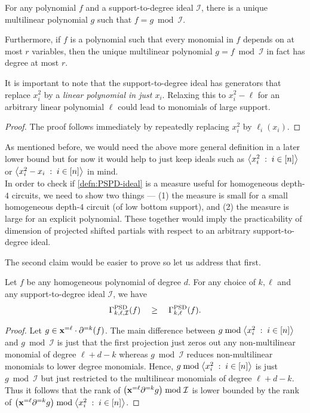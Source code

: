 \begin{observation}\label{obs:support-redn}
For any polynomial $f$ and a support-to-degree ideal $\mathcal{I}$, there is a unique multilinear polynomial $g$ such that $f = g \bmod\mathcal{I}$. 

Furthermore, if $f$ is a polynomial such that every monomial in $f$ depends on at most $r$ variables, then the unique multilinear polynomial $g = f \bmod\mathcal{I}$ in fact has degree at most $r$. 
\end{observation}

It is important to note that the support-to-degree ideal has generators that replace $x_i^2$ by a \emph{linear polynomial in just $x_i$}. Relaxing this to $x_i^2 - \ell$ for an arbitrary linear polynomial $\ell$ could lead to monomials of large support. 

\begin{proof}
The proof follows immediately by repeatedly replacing $x_i^2$ by $\ell_i(x_i)$.
\end{proof}

As mentioned before, we would need the above more general definition in a later lower bound but for now it would help to just keep ideals such as $\left\langle x_i^2\;:\;i\in [n]\right\rangle$ or $\left\langle x_i^2 - x_i\;:\;i\in [n]\right\rangle$ in mind. \\

In order to check if \autoref{defn:PSPD-ideal} is a measure useful for homogeneous depth-$4$ circuits, we need to show two things --- (1) the measure is small for a small homogeneous depth-$4$ circuit (of low bottom support), and (2) the measure is large for an explicit polynomial.
These together would imply the practicability of dimension of projected shifted partials with respect to an arbitrary support-to-degree ideal.

The second claim would be easier to prove so let us address that first. 

\begin{lemma}\label{lem:PSD-I-lowerbound} Let $f$ be any homogeneous polynomial of degree $d$. For any choice of $k,\ell$ and any support-to-degree ideal $\mathcal{I}$, we have
\[
\Gamma^{\mathrm{PSD}}_{k,\ell,\mathcal{I}}(f) \quad \geq \quad \Gamma^{\mathrm{PSD}}_{k,\ell}(f).
\]
\end{lemma}
\begin{proof}
  Let $g \in \mathbf{x}^{=\ell} \cdot \partial^{=k}(f)$.
The main difference between $g \bmod \left\langle x_i^2\;:\; i \in [n]\right\rangle$ and $g \bmod\mathcal{I}$ is just that the first projection just zeros out any non-multilinear monomial of degree $\ell + d -k$ whereas $g \bmod\mathcal{I}$ reduces non-multilinear monomials to lower degree monomials.
Hence, $g \bmod\left\langle x_i^2\;:\; i \in [n]\right\rangle$ is just $g \bmod \mathcal{I}$ but just restricted to the multilinear monomials of degree $\ell + d - k$. 
Thus it follows that the rank of $\left(\mathbf{x}^{=\ell} \partial^{=k}g\right) \bmod\mathcal{I}$ is lower bounded by the rank of $\left(\mathbf{x}^{=\ell} \partial^{=k}g\right) \bmod\left\langle x_i^2\;:\; i \in [n]\right\rangle$.
\end{proof}

